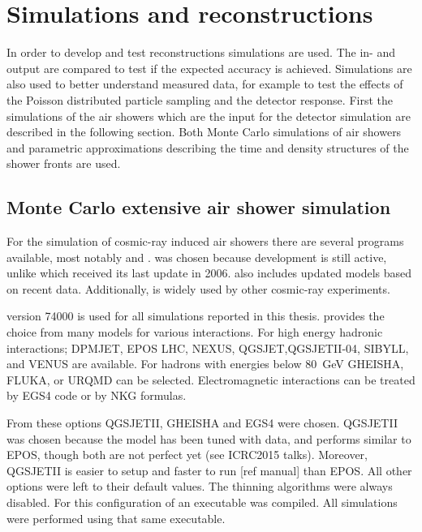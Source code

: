 \chapter{Simulations and reconstructions}
\label{ch:reconstructions}


In order to develop and test reconstructions simulations are used. The in- and output are compared to test if the expected accuracy is achieved. Simulations are also used to better understand measured data, for example to test the effects of the Poisson distributed particle sampling and the detector response. First the simulations of the air showers which are the input for the detector simulation are described in the following section. Both Monte Carlo simulations of air showers and parametric approximations describing the time and density structures of the shower fronts are used.


\section{Monte Carlo extensive air shower simulation}

For the simulation of cosmic-ray induced air showers there are several programs available, most notably \corsika and \aires \cite{sciutto1999}. \corsika was chosen because development is still active, unlike \aires which received its last update in 2006. \corsika also includes updated models based on recent \lhc data. Additionally, \corsika is widely used by other cosmic-ray experiments.

\corsika version 74000 is used for all simulations reported in this thesis. \corsika provides the choice from many models for various interactions. For high energy hadronic interactions; DPMJET, EPOS LHC\cite{pierog2013}, NEXUS, QGSJET,QGSJETII-04\cite{ostapchenko2013}, SIBYLL, and VENUS are available. For hadrons with energies below \SI{80}{\GeV} GHEISHA\cite{fesefeldt1985}, FLUKA, or URQMD can be selected. Electromagnetic interactions can be treated by EGS4\cite{egs4} code or by NKG formulas.

From these options QGSJETII, GHEISHA and EGS4 were chosen. QGSJETII was chosen because the model has been tuned with \lhc data, and performs similar to EPOS, though both are not perfect yet (see ICRC2015 talks). Moreover, QGSJETII is easier to setup and faster to run [ref manual] than EPOS. All other options were left to their default values. The thinning algorithms were always disabled. For this configuration of \corsika an executable was compiled.  All simulations were performed using that same executable. 

